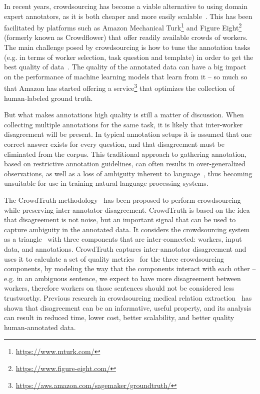 In recent years, crowdsourcing has become a viable alternative to using domain expert annotators, as it is both cheaper and more easily scalable~\cite{Sabou:2012:CRO:2362456.2362479}. This has been facilitated by platforms such as Amazon Mechanical Turk\footnote{\url{https://www.mturk.com/}} and Figure Eight\footnote{\url{https://www.figure-eight.com/}} (formerly known as Crowdflower) that offer readily available crowds of workers. The main challenge posed by crowdsourcing is how to tune the annotation tasks (e.g. in terms of worker selection, task question and template) in order to get the best quality of data~\cite{Difallah2012}. The quality of the annotated data can have a big impact on the performance of machine learning models that learn from it -- so much so that Amazon has started offering a service\footnote{\url{https://aws.amazon.com/sagemaker/groundtruth/}} that optimizes the collection of human-labeled ground truth.

But what makes annotations high quality is still a matter of discussion. When collecting multiple annotations for the same task, it is likely that inter-worker disagreement will be present. In typical annotation setups it is assumed that one correct answer exists for every question, and that disagreement must be eliminated from the corpus. This traditional approach to gathering annotation, based on restrictive annotation guidelines, can often results in over-generalized observations, as well as a loss of ambiguity inherent to language~\cite{aroyo2012harnessing}, thus becoming unsuitable for use in training natural language processing systems. %

The CrowdTruth methodology~\cite{aroyo2015truth,aroyo2013crowd} has been proposed to perform crowdsourcing while preserving inter-annotator disagreement. CrowdTruth is based on the idea~\cite{aroyo2015truth} that disagreement is not noise, but an important signal that can be used to capture ambiguity in the annotated data. It considers the crowdsourcing system as a triangle~\cite{aroyo2014threesides} with three components that are inter-connected: workers, input data, and annotations. CrowdTruth captures inter-annotator disagreement and uses it to calculate a set of quality metrics~\cite{inel2013,dumitrache2018crowdtruth} for the three crowdsourcing components, by modeling the way that the components interact with each other -- e.g. in an ambiguous sentence, we expect to have more disagreement between workers, therefore workers on those sentences should not be considered less trustworthy. Previous research in crowdsourcing medical relation extraction~\cite{aroyo2013crowd,aroyo2013measuring} has shown that disagreement can be an informative, useful property, and its analysis can result in reduced time, lower cost, better scalability, and better quality human-annotated data.

